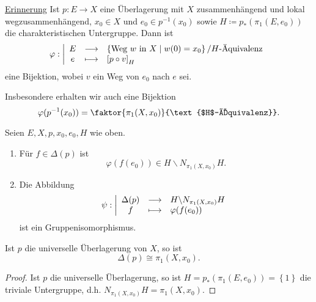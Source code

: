 \underline{Erinnerung} Ist $p\colon  E\to X$ eine Überlagerung mit $X$ zusammenhängend und lokal wegzusammenhängend,  $x_0\in X$ und $e_0\in p^{-1} (x_0)$ sowie $H\coloneqq p_*(\pi_1(E,e_0))$ die charakteristischen Untergruppe. Dann ist
    \begin{equation*}
    \varphi : \left| \begin{array}{c c l} 
        E & \longrightarrow & \left \{\text{Weg $w$ in  $X$}\mid  w(0) = x_0\right\} / \text{$H$-Äquivalenz} \\
e & \longmapsto &  \left[ p \circ  v \right] _H
    \end{array} \right.
\end{equation*}
eine Bijektion, wobei $v$ ein Weg von  $e_0$ nach $e$ sei.

Insbesondere erhalten wir auch eine Bijektion
\[
    \varphi (p^{-1} (x_0)) = \faktor{\pi_1(X,x_0)}{\text{$H$-Äquivalenz}}
.\] 

\begin{theorem}\label{thm:isomorphismus-von-decktransformationen-mit-nebenklassengruppe-von-charakteristischer-untergruppe-in-seinem-normalisator}
    Seien $E,X,p,x_0,e_0,H$ wie oben.
    \begin{enumerate}[1)]
        \item Für $f\in \Delta(p)$ ist
            \[
                \varphi (f(e_0)) \in H \backslash N_{\pi_1(X,x_0)}H
            .\] 
        \item Die Abbildung
                \begin{equation*}
                \psi : \left| \begin{array}{c c l} 
                    \Delta(p) & \longrightarrow & H \backslash N_{\pi_1(X,x_0)}H \\
                    f & \longmapsto &  \varphi (f(e_0))
                \end{array} \right.
            \end{equation*}
           ist ein Gruppenisomorphismus. 
    \end{enumerate}
\end{theorem}

\begin{dcorollary}\label{cor:bei-universeller-überlagerung-sind-decktransformationen-isomorph-zu-fundamentalgruppe}
    Ist $p$ die universelle Überlagerung von  $X$, so ist
    \[
        \Delta(p) \cong \pi_1(X,x_0)
    .\] 
\end{dcorollary}

\begin{proof}
    Ist $p$ die universelle Überlagerung, so ist  $H = p_*(\pi_1(E,e_0)) = \left \{1\right\} $ die triviale Untergruppe, d.h. $N_{\pi_1(X,x_0)}H = \pi_1(X,x_0)$.
\end{proof}

